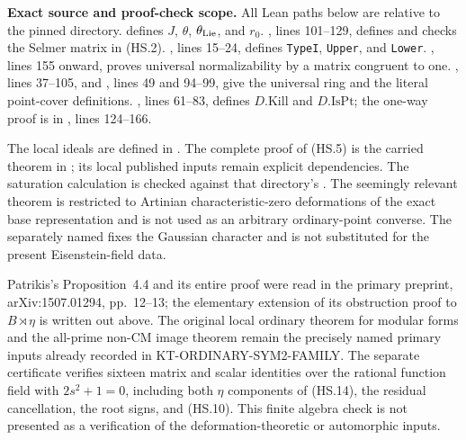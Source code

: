 \documentclass[11pt,a4paper]{article}
\theoremstyle{definition}
\renewcommand{\paragraph}[1]{\par\smallskip\noindent\textbf{#1}\quad\ignorespaces}
\begin{document}
\paragraph{Exact source and proof-check scope.}
All Lean paths below are relative to the pinned
 directory.
defines $J$, $\theta$, $\theta_{\rm Lie}$, and $r_0$.
, lines 101--129, defines and checks
the Selmer matrix in (HS.2).
, lines 15--24,
defines \texttt{TypeI}, \texttt{Upper}, and \texttt{Lower}.
, lines 155 onward, proves universal
normalizability by a matrix congruent to one.
, lines 37--105, and
, lines 49 and 94--99, give the
universal ring and the literal point-cover definitions.
, lines 61--83, defines
$D.\mathrm{Kill}$ and $D.\mathrm{IsPt}$; the one-way
 proof is in ,
lines 124--166.

The local ideals are defined in
.
The complete proof of (HS.5) is the carried
 theorem in
;
its local published inputs remain explicit dependencies.
The saturation calculation is checked against that
directory's .
The seemingly relevant 
theorem is restricted to Artinian characteristic-zero
deformations of the exact base representation and is not
used as an arbitrary ordinary-point converse.
The separately named 
fixes the Gaussian character and is not substituted for
the present Eisenstein-field data.

Patrikis's Proposition~4.4 and its entire proof were read
in the primary preprint, arXiv:1507.01294, pp.~12--13;
the elementary extension of its obstruction proof to
$B\rtimes\eta$ is written out above.  The original local
ordinary theorem for modular forms and the all-prime
non-CM image theorem remain the precisely named primary
inputs already recorded in KT-ORDINARY-SYM2-FAMILY.
The separate 
certificate verifies sixteen matrix and scalar identities
over the rational function field with $2s^2+1=0$, including
both $\eta$ components of (HS.14), the residual cancellation,
the root signs, and (HS.10).  This finite algebra check is
not presented as a verification of the deformation-theoretic
or automorphic inputs.
\end{document}
